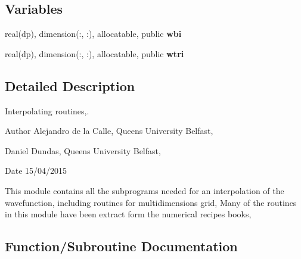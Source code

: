 \subsection*{Variables}
\begin{DoxyCompactItemize}
\item 
\mbox{\label{namespacecubic__interp_a71aadf17555e7e5152368db60ab724c1}} 
real(dp), dimension(\+:, \+:), allocatable, public {\bfseries wbi}
\item 
\mbox{\label{namespacecubic__interp_affcc410624234e1e707635bc35c0b560}} 
real(dp), dimension(\+:, \+:), allocatable, public {\bfseries wtri}
\end{DoxyCompactItemize}


\subsection{Detailed Description}
Interpolating routines,. 

\begin{DoxyAuthor}{Author}
Alejandro de la Calle, Queen\textquotesingle{}s University Belfast, 

Daniel Dundas, Queen\textquotesingle{}s University Belfast, 
\end{DoxyAuthor}
\begin{DoxyDate}{Date}
15/04/2015
\end{DoxyDate}
This module contains all the subprograms needed for an interpolation of the wavefunction, including routines for multidimensions grid, Many of the routines in this module have been extract form the numerical recipes books, 

\subsection{Function/\+Subroutine Documentation}
\mbox{\label{namespacecubic__interp_ade3b7f9c8f620bfa6154cbe10d683532}} 
